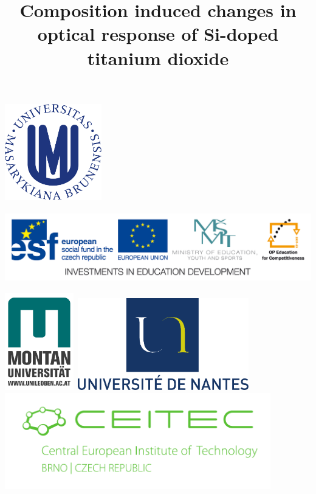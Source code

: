 \documentclass[blues]{poster}
\begin{document}
\title{Composition induced changes in optical response of Si-doped titanium dioxide}
\affiliation
  {\hsize=18cm
   \hbox{\includegraphics[height=4.2cm]{MU-blue.pdf} \quad
	\includegraphics[height=3.8cm]{OPVK_hor_zakladni_logolink_RGB_eng.jpg}}
   \hbox{\includegraphics[height=4.2cm]{MUL.jpeg}\quad
		 \includegraphics[height=4.0cm]{University_of_Nantes.pdf}
         \includegraphics[height=4.2cm]{CEITEC.pdf}}
	}
\end{document}
